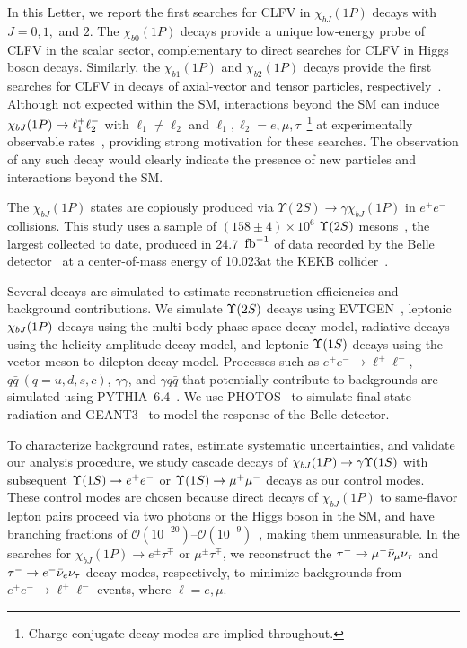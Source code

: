 \documentclass[aps,prl,twocolumn,superscriptaddress,showpacs,preprintnumbers,amsmath,amssymb, nofootinbib]{revtex4-2}
\begin{document}
In this Letter, we report the first searches for CLFV in $\chi_{bJ}(1P)$ decays with $J=0, 1,$ and $2$.
The $\chi_{b0}(1P)$ decays provide a unique low-energy probe of CLFV in the scalar sector, complementary to direct searches for CLFV in Higgs boson decays.
Similarly, the $\chi_{b1}(1P)$ and $\chi_{b2}(1P)$ decays provide the first searches for CLFV in decays of axial-vector and tensor particles, respectively~\cite{Hazard:2016fnc}.
Although not expected within the SM, interactions beyond the SM can induce
$\chi_{bJ}(1P)\rightarrow \ell_1^+\ell^-_2$ with $\ell_1\neq\ell_2$ and $\ell_1,\ell_2=e,\mu,\tau$~\footnote{Charge-conjugate decay modes are implied throughout.}
at experimentally observable rates~\cite{Hazard:2016fnc}, providing strong motivation for these searches.
The observation of any such decay would clearly indicate the presence of new particles and interactions beyond the SM.

The $\chi_{bJ}(1P)$ states are copiously produced via $\Upsilon(2S)\to \gamma\chi_{bJ}(1P)$ in $e^+e^-$ collisions.
This study uses a sample of $(158 \pm 4) \times 10^6$ $\Upsilon(2S)$ mesons~\cite{Wang:2011ny2}, the largest collected to date, produced in 24.7~${\rm fb}^{-1}$ of data recorded by the Belle detector~\cite{Belle:2000cnh, Belle:2012iwr}
at a center-of-mass energy of 10.023\gev at the KEKB collider~\cite{Kurokawa:2001nw,Abe:2013fma}.

Several decays are simulated to estimate reconstruction efficiencies and background contributions.
We simulate $\Upsilon(2S)$ decays using EVTGEN~\cite{Lange:2001uf},
leptonic $\chi_{bJ}(1P)$ decays using the multi-body phase-space decay model,
radiative decays using the helicity-amplitude decay model,
and leptonic $\Upsilon(1S)$ decays using the vector-meson-to-dilepton decay model.
Processes such as $e^+e^- \to \ell^+\ell^-$, $q\bar{q}~(q=u,d,s,c)$, $\gamma\gamma$, and $\gamma q\bar{q}$
that potentially contribute to backgrounds are simulated using PYTHIA~6.4~\cite{Sjöstrand_2006}.
We use PHOTOS~\cite{Barberio:1993qi} to simulate final-state radiation and GEANT3~\cite{Brun:1987ma} to model the response of the Belle detector.

To characterize background rates, estimate systematic uncertainties, and validate our analysis procedure,
we study cascade decays of $\chi_{bJ}(1P)\rightarrow\gamma\Upsilon(1S)$ with subsequent $\Upsilon(1S)\rightarrow e^+e^-$ or $\Upsilon(1S)\rightarrow\mu^+\mu^-$ decays as our control modes.
These control modes are chosen because direct decays of $\chi_{bJ}(1P)$ to same-flavor lepton pairs proceed via two photons or the Higgs boson in the SM,
and have branching fractions of ${\mathcal{O}}(10^{-20})\text{--}{\mathcal{O}}(10^{-9})$~\cite{Godfrey:2015vda}, making them unmeasurable.
In the searches for $\chi_{bJ}(1P) \to e^\pm \tau^\mp$ or $\mu^\pm \tau^\mp$, we reconstruct the $\tau^-\rightarrow \mu^-\bar{\nu}_\mu\nu_\tau$ and $\tau^-\rightarrow e^-\bar{\nu}_e\nu_\tau$ decay modes, respectively,
to minimize backgrounds from $e^+ e^- \to \ell^+ \ell^-$ events, where $\ell = e, \mu$.
\end{document}
